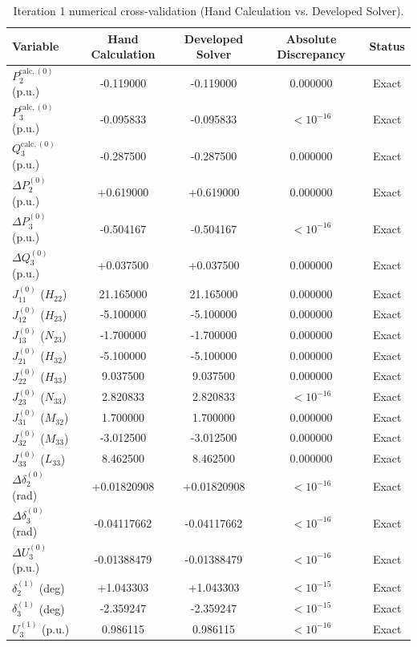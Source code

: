 \documentclass[12pt,a4paper,oneside]{report}
\begin{document}
\begin{table}[H]
\centering
\caption{Iteration 1 numerical cross-validation (Hand Calculation vs. Developed Solver).}
\label{tab:iter1_validation}
\begin{tabular}{lcccc}
\toprule
\textbf{Variable} & \textbf{Hand Calculation} & \textbf{Developed Solver} & \textbf{Absolute Discrepancy} & \textbf{Status} \\
\midrule
$P_2^{\text{calc},(0)}$ (p.u.) & -0.119000 & -0.119000 & $0.000000$ & Exact \\
$P_3^{\text{calc},(0)}$ (p.u.) & -0.095833 & -0.095833 & $< 10^{-16}$ & Exact \\
$Q_3^{\text{calc},(0)}$ (p.u.) & -0.287500 & -0.287500 & $0.000000$ & Exact \\
$\Delta P_2^{(0)}$ (p.u.) & +0.619000 & +0.619000 & $0.000000$ & Exact \\
$\Delta P_3^{(0)}$ (p.u.) & -0.504167 & -0.504167 & $< 10^{-16}$ & Exact \\
$\Delta Q_3^{(0)}$ (p.u.) & +0.037500 & +0.037500 & $0.000000$ & Exact \\
$J_{11}^{(0)}$ ($H_{22}$) & 21.165000 & 21.165000 & $0.000000$ & Exact \\
$J_{12}^{(0)}$ ($H_{23}$) & -5.100000 & -5.100000 & $0.000000$ & Exact \\
$J_{13}^{(0)}$ ($N_{23}$) & -1.700000 & -1.700000 & $0.000000$ & Exact \\
$J_{21}^{(0)}$ ($H_{32}$) & -5.100000 & -5.100000 & $0.000000$ & Exact \\
$J_{22}^{(0)}$ ($H_{33}$) & 9.037500 & 9.037500 & $0.000000$ & Exact \\
$J_{23}^{(0)}$ ($N_{33}$) & 2.820833 & 2.820833 & $< 10^{-16}$ & Exact \\
$J_{31}^{(0)}$ ($M_{32}$) & 1.700000 & 1.700000 & $0.000000$ & Exact \\
$J_{32}^{(0)}$ ($M_{33}$) & -3.012500 & -3.012500 & $0.000000$ & Exact \\
$J_{33}^{(0)}$ ($L_{33}$) & 8.462500 & 8.462500 & $0.000000$ & Exact \\
$\Delta \delta_2^{(0)}$ (rad) & +0.01820908 & +0.01820908 & $< 10^{-16}$ & Exact \\
$\Delta \delta_3^{(0)}$ (rad) & -0.04117662 & -0.04117662 & $< 10^{-16}$ & Exact \\
$\Delta U_3^{(0)}$ (p.u.) & -0.01388479 & -0.01388479 & $< 10^{-16}$ & Exact \\
$\delta_2^{(1)}$ (deg) & +1.043303 & +1.043303 & $< 10^{-15}$ & Exact \\
$\delta_3^{(1)}$ (deg) & -2.359247 & -2.359247 & $< 10^{-15}$ & Exact \\
$U_3^{(1)}$ (p.u.) & 0.986115 & 0.986115 & $< 10^{-16}$ & Exact \\
\bottomrule
\end{tabular}
\end{table}
\end{document}
